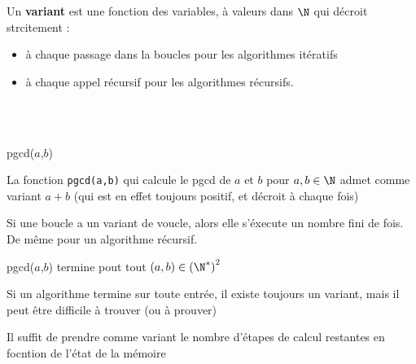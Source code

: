 \begin{definition}
	Un \textbf{variant} est une fonction des variables, à valeurs dans $\N$ qui décroit strcitement :
	\begin{itemize}
		\item à chaque passage dans la boucles pour les algorithmes itératifs
		\item à chaque appel récursif pour les algorithmes récursifs.
	\end{itemize}
\end{definition}

\begin{example} \enspace \\ \\ \label{1-2}
	\begin{minipage}{0.5 \linewidth}
		\begin{algorithm}[H]
			\caption{pgcd($a$,$b$)}
		\end{algorithm}
	\end{minipage} \quad \begin{minipage}{0.4 \linewidth}
		La fonction \texttt{pgcd(a,b)} qui calcule le pgcd de $a$ et $b$ pour $a, b \in \N$ admet comme variant $a+b$ (qui est en effet toujours positif, et décroit à chaque fois)
	\end{minipage}
\end{example}

\begin{proposition}
	\label{1-1}
	Si une boucle a un variant de voucle, alors elle s'éxecute un nombre fini de fois. De même pour un algorithme récursif.
\end{proposition}

\begin{example}
	pgcd($a$,$b$) termine pout tout $(a,b)\in \left(\N^*\right)^2$
\end{example}

\begin{rem}
	Si un algorithme termine sur toute entrée, il existe toujours un variant, mais il peut être difficile à trouver (ou à prouver)
\end{rem}

\begin{com}
	Il suffit de prendre comme variant le nombre d'étapes de calcul restantes en focntion de l'état de la mémoire
\end{com}

